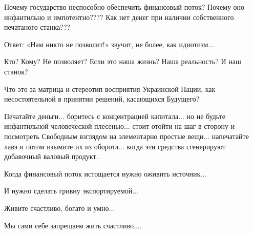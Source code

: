 Почему государство неспособно обеспечить финансовый поток? Почему оно
инфантильно и импотентно???? Как нет денег при наличии собственного печатаного
станка??? 

Ответ: «Нам никто не позволит!» звучит, не более, как идиотизм...

Кто? Кому? Не позволяет? Если это наша жизнь? Наша реальность? И наш станок?

Что это за матрица и стереотип восприятия Украинской Нации, как несостоятельной
в принятии решений, касающихся Будущего? 

Печатайте деньги... боритесь с концентрацией капитала... но не будьте
инфантильной человеческой плесенью... стоит отойти на шаг в сторону и
посмотреть Свободным взглядом на элементарно простые вещи... напечатайте лавэ и
потом изымите их из оборота... когда эти средства сгенерируют добавочный
валовый продукт..

Когда финансовый поток истощается нужно оживить источник...

И нужно сделать гривну экспортируемой...

Живите счастливо, богато и умно...

Мы сами себе запрещаем жить счастливо....

